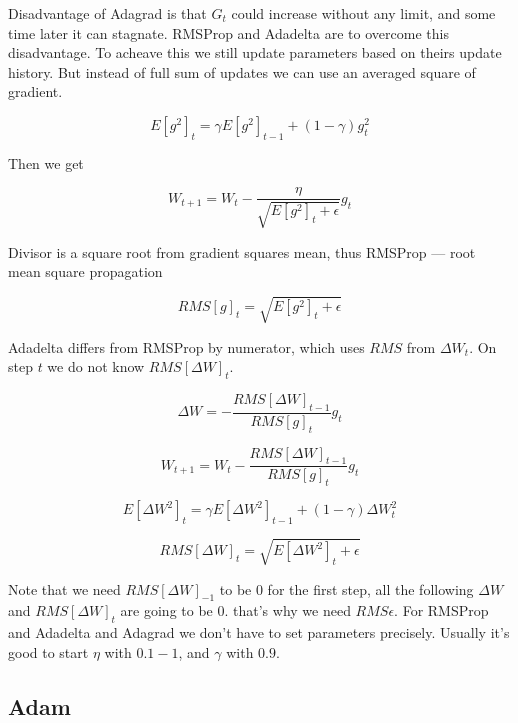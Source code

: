 Disadvantage of Adagrad is that $G_{t}$ could increase without any limit, and some time later it can stagnate. RMSProp and Adadelta are to overcome this disadvantage. To acheave this we still update parameters based on theirs update history. But instead of full sum of updates we can use an averaged square of gradient.

\begin{equation}
    E[g^2]_t = \gamma E[g^2]_{t-1} + (1 - \gamma) g^2_t
\end{equation}

Then we get

\begin{equation}
    W_{t+1} = W_{t} - \frac{\eta}{\sqrt{E[g^2]_t + \epsilon}} g_{t}
\end{equation}

Divisor is a square root from gradient squares mean, thus RMSProp — root mean square propagation

\begin{equation}
    RMS[g]_t = \sqrt {E[g^2]_t + \epsilon }
\end{equation}

Adadelta differs from RMSProp by numerator, which uses $RMS$ from $\Delta W_t$. On step $t$ we do not know $RMS[\Delta W]_{t}$.

\begin{equation}
    \Delta W = -\frac{RMS[\Delta W]_{t-1}}{RMS[g]_{t}}g_{t}
\end{equation}

\begin{equation}
    W_{t+1} = W_{t} - \frac{RMS[\Delta W]_{t-1}}{RMS[g]_{t}}g_{t}
\end{equation}

\begin{equation}
    E[\Delta W^2]_t = \gamma E[\Delta W^2]_{t-1} + (1 - \gamma) \Delta W^2_t
\end{equation}

\begin{equation}
    RMS[\Delta W]_{t} = \sqrt{E[\Delta W^2]_t + \epsilon}
\end{equation}

Note that we need $RMS[\Delta W]_{-1}$ to be $0$ for the first step, all the following $\Delta W$ and $RMS[\Delta W]_{t}$ are going to be $0$. that's why we need $RMS \epsilon$. For RMSProp and Adadelta and Adagrad we don't have to set parameters precisely. Usually it's good to start $\eta$ with $0.1 - 1$, and $\gamma$ with $0.9$.

\subsection{Adam}

